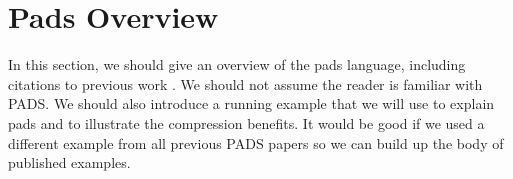\section{Pads Overview}
\label{sec:pads}
In this section, we should give an overview of the pads language,
including citations to previous work \cite{fisher+:pads}.  We should
not assume the reader is familiar with PADS.  We should also introduce
a running example that we will use to explain pads and to illustrate
the compression benefits.  It would be good if we used a different
example from all previous PADS papers so we can build up the body of
published examples.